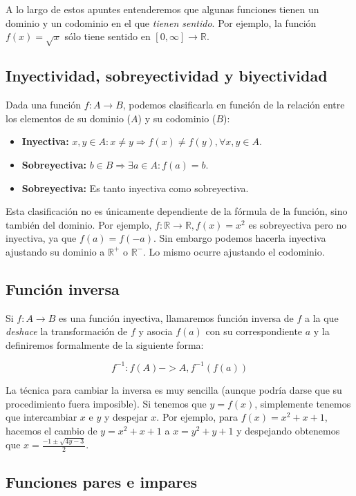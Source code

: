 A lo largo de estos apuntes entenderemos que algunas funciones tienen un dominio y un codominio en el que \textit{tienen sentido}.
Por ejemplo, la función $f(x) = \sqrt{x}$ sólo tiene sentido en $[0,\infty] \rightarrow \mathbb{R}$.

\subsection{Inyectividad, sobreyectividad y biyectividad}

Dada una función $f : A \rightarrow B$, podemos clasificarla en función de la relación entre los elementos de su dominio ($A$) y su codominio ($B$):

\begin{itemize}
	\item\textbf{Inyectiva:}
		$x,y \in A : x \neq y \Rightarrow f(x) \neq f(y), \forall x,y \in A$.
	\item\textbf{Sobreyectiva:}
		$b \in B \Rightarrow \exists a \in A : f(a) = b$.
	\item\textbf{Sobreyectiva:}
		Es tanto inyectiva como sobreyectiva.
\end{itemize}

Esta clasificación no es únicamente dependiente de la fórmula de la función, sino también del dominio.
Por ejemplo, $f : \mathbb{R} \rightarrow \mathbb{R}, f(x) = x^2$ es sobreyectiva pero no inyectiva, ya que $f(a) = f(-a)$.
Sin embargo podemos hacerla inyectiva ajustando su dominio a $\mathbb{R}^+$ o $\mathbb{R}^-$.
Lo mismo ocurre ajustando el codominio.

\subsection{Función inversa}

Si $f : A \rightarrow B$ es una función inyectiva, llamaremos función inversa de $f$ a la que \textit{deshace} la transformación de $f$ y asocia $f(a)$ con su correspondiente $a$ y la definiremos formalmente de la siguiente forma:

\[f^{-1} : f(A) -> A, f^{-1}(f(a))\]

La técnica para cambiar la inversa es muy sencilla (aunque podría darse que su procedimiento fuera imposible).
Si tenemos que $y = f(x)$, simplemente tenemos que intercambiar $x$ e $y$ y despejar $x$.
Por ejemplo, para $f(x) = x^2 + x + 1$, hacemos el cambio de $y = x^2 + x + 1$ a $x = y^2 + y + 1$ y despejando obtenemos que $x = \frac{-1 \pm \sqrt{4y-3}}{2}$.
\subsection{Funciones pares e impares}

